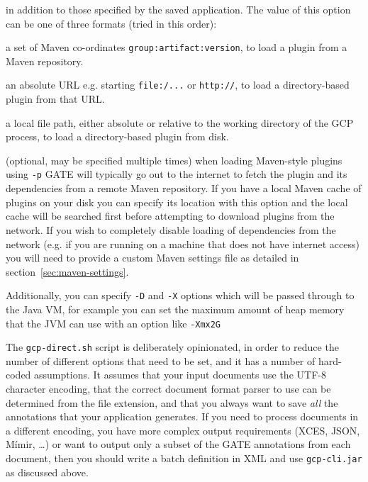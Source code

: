   in addition to those specified by the saved application.  The value of this
  option can be one of three formats (tried in this order):
  \ben
  \item a set of Maven co-ordinates \verb!group:artifact:version!, to load
    a plugin from a Maven repository.
  \item an absolute URL e.g. starting \verb!file:/...! or \verb!http://!, to
    load a directory-based plugin from that URL.
  \item a local file path, either absolute or relative to the working directory
    of the GCP process, to load a directory-based plugin from disk.
  \een
\item[-C] (optional, may be specified multiple times) when loading Maven-style
  plugins using \verb!-p! GATE will typically go out to the internet to fetch the
  plugin and its dependencies from a remote Maven repository.  If you have a local
  Maven cache of plugins on your disk you can specify its location with this option
  and the local cache will be searched first before attempting to download plugins
  from the network.  If you wish to completely disable loading of dependencies from
  the network (e.g. if you are running on a machine that does not have internet
  access) you will need to provide a custom Maven settings file as detailed in
  section~\ref{sec:maven-settings}.
\ede

Additionally, you can specify \verb!-D! and \verb!-X! options which will be
passed through to the Java VM, for example you can set the maximum amount of
heap memory that the JVM can use with an option like \verb!-Xmx2G!

The \verb!gcp-direct.sh! script is deliberately opinionated, in order to reduce
the number of different options that need to be set, and it has a number of
hard-coded assumptions.  It assumes that your input documents use the UTF-8
character encoding, that the correct document format parser to use can be
determined from the file extension, and that you always want to save \emph{all}
the annotations that your application generates.  If you need to process
documents in a different encoding, you have more complex output requirements
(XCES, JSON, M\'{i}mir, \ldots) or want to output only a subset of the GATE
annotations from each document, then you should write a batch definition in XML
and use \verb!gcp-cli.jar! as discussed above.

